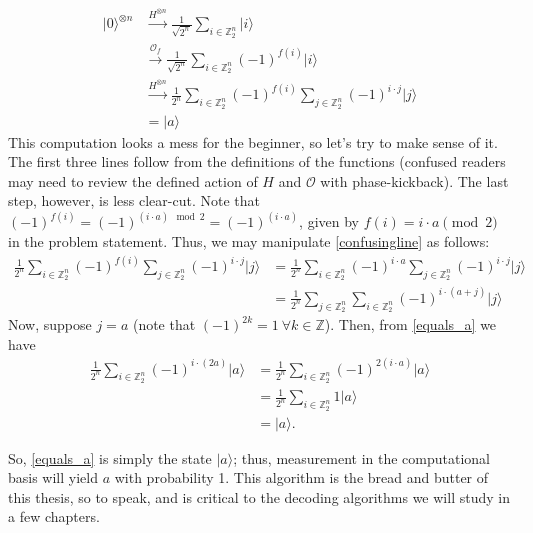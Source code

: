 \documentclass[12pt,twoside]{reedthesis}
\theoremstyle{definition}
\newcommand{\Z}{\mathbb{Z}}
\newcommand{\ketz}{\ensuremath{\lvert 0\rangle}\xspace}
\newcommand{\ket}[1]{\ensuremath{\lvert #1\rangle}\xspace}
\begin{document}
\begin{align}
 \ketz^{\otimes n}
& \xrightarrow{H^{\otimes n}}\frac{1}{\sqrt{2^n}} \sum_{i \in \Z_2^n} \ket{i} \\
& \xrightarrow{\mathcal{O}_f} \frac{1}{\sqrt{2^n}} \sum_{i \in \Z_2^n} (-1)^{f(i)}\ket{i}\\
& \xrightarrow{H^{\otimes n}} \frac{1}{2^n} \sum_{i \in \Z_2^n} (-1)^{f(i)} \sum_{j \in \Z_2^n} (-1)^{i \cdot j} \ket{j} \label{confusingline}\\
& = \ket{a}
\end{align}
This computation looks a mess for the beginner, so let's try to make sense of it. The first three lines follow from the definitions of the functions (confused readers may need to review the defined action of $H$ and $\mathcal{O}$ with phase-kickback). The last step, however, is less clear-cut. Note that $(-1)^{f(i)} = (-1)^{(i \cdot a) \mod{2}}= (-1)^{(i \cdot a)}$, given by $f(i) = i \cdot a \pmod{2}$ in the problem statement. Thus, we may manipulate \ref{confusingline} as follows:
\begin{align}
 \frac{1}{2^n} \sum_{i \in \Z_2^n} (-1)^{f(i)} \sum_{j \in \Z_2^n} (-1)^{i \cdot j} \ket{j}
& = \frac{1}{2^n} \sum_{i \in \Z_2^n} (-1)^{i \cdot a} \sum_{j \in \Z_2^n} (-1)^{i \cdot j} \ket{j} \\
& = \frac{1}{2^n}  \sum_{j \in \Z_2^n}\sum_{i \in \Z_2^n} (-1)^{i \cdot(a + j)}  \ket{j} \label{equals_a}
\end{align}
Now, suppose $j=a$ (note that $(-1)^{2k} = 1~\forall k \in \Z$). Then, from \ref{equals_a} we have
\begin{align*}
\frac{1}{2^n}  \sum_{i \in \Z_2^n} (-1)^{i \cdot (2a)}  \ket{a} 
& = \frac{1}{2^n}  \sum_{i \in \Z_2^n} (-1)^{2(i \cdot a)}  \ket{a} \\
& = \frac{1}{2^n}  \sum_{i \in \Z_2^n} 1 \ket{a}  \\
& = \ket{a}.
\end{align*}

So, \ref{equals_a} is simply the state $\ket{a}$; thus, measurement in the computational basis will yield $a$ with probability 1. This algorithm is the bread and butter of this thesis, so to speak, and is critical to the decoding algorithms we will study in a few chapters. 
\end{document}
